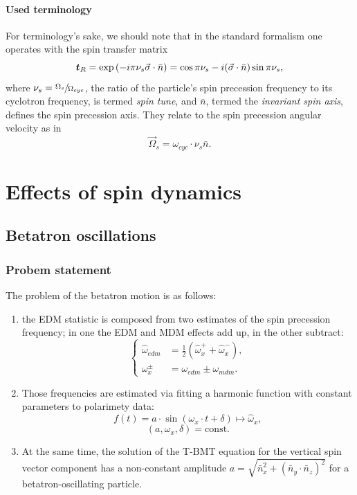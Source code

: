 \documentclass[preprint, review]{elsarticle}
\newcommand{\w}{\omega}
\newcommand{\W}{\Omega}
\newcommand{\nbar}{\bar n}
\newcommand{\const}{\mathrm{const}}
\begin{document}
\paragraph{Used terminology}
For terminology's sake, we should note that in the standard formalism one operates with
the spin transfer matrix~\cite[p.~4]{COSY:SpinTuneMapping}
\[
\boldsymbol{t}_R = \exp\bkt{-i\pi\nu_s\vec\sigma\cdot\bar n} = \cos\pi\nu_s - i (\vec\sigma\cdot\bar n)\sin\pi\nu_s,
\]
where $\nu_s = \sfrac{\W_s}{\W_{cyc}}$, the ratio of the particle's spin precession frequency to
its cyclotron frequency, is termed \emph{spin tune}, and $\bar n$, termed the \emph{invariant spin axis},
defines the spin precession axis. They relate to the spin precession angular velocity as in
\[
\vec\W_s = \w_{cyc}\cdot \nu_s\bar n.
\]

\section{Effects of spin dynamics}
\subsection{Betatron oscillations}

\subsubsection{Probem statement}
The problem of the betatron motion is as follows:
\begin{enumerate}
\item the EDM statistic is composed from two estimates of the spin precession frequency;
  in one the EDM and MDM effects add up, in the other subtract:
  \begin{equation*}
    \begin{cases}
      \hat\w_{edm} &= \frac12(\hat\w_x^+ + \hat\w_x^-),\\
      \w_x^\pm &= \w_{edm} \pm \w_{mdm}.
    \end{cases}
  \end{equation*}
\item Those frequencies are estimated via fitting a harmonic function with constant parameters to
  polarimety data:
\[
f(t) = a\cdot\sin(\w_x\cdot t + \delta) \mapsto \hat\w_x,
\]
\[
(a,\w_x,\delta) = \const.
\]

\item At the same time, the solution of the T-BMT equation for the vertical spin vector component
  has a non-constant amplitude $a = \sqrt{\nbar_x^2 + (\nbar_y\cdot\nbar_z)^2}$
  for a betatron-oscillating particle.
\end{enumerate}
\end{document}
